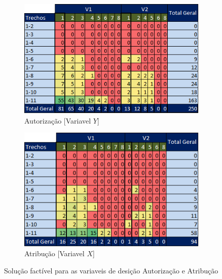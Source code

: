 \begin{figure}[h!]
	\centering
	\begin{subfigure}[b]{0.450\linewidth}
		\includegraphics[width=\linewidth]{img/auto_sf.png}
		\caption{Autorização [Variavel $Y$]}
		\label{fig:auto_assig_a}
	\end{subfigure}\hspace{5mm}
	\begin{subfigure}[b]{0.434\linewidth}
		\includegraphics[width=\linewidth]{img/assig_sf.png}
		\caption{Atribução [Variavel $X$]}
		\label{fig:auto_assig_b}
	\end{subfigure}
	\caption{Solução factível para as variaveis de desição Autorização e Atribução}
	\label{fig:auto_assig}
\end{figure}

